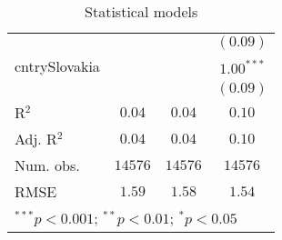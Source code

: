 \begin{table}
\begin{center}
\begin{tabular}{l c c c}
               &               &               & $(0.09)$      \\
cntrySlovakia  &               &               & $1.00^{***}$  \\
               &               &               & $(0.09)$      \\
\hline
R$^2$          & $0.04$        & $0.04$        & $0.10$        \\
Adj. R$^2$     & $0.04$        & $0.04$        & $0.10$        \\
Num. obs.      & $14576$       & $14576$       & $14576$       \\
RMSE           & $1.59$        & $1.58$        & $1.54$        \\
\hline
\multicolumn{4}{l}{\scriptsize{$^{***}p<0.001$; $^{**}p<0.01$; $^{*}p<0.05$}}
\end{tabular}
\caption{Statistical models}
\label{table:coefficients}
\end{center}
\end{table}
